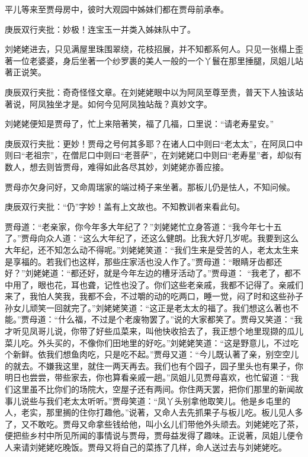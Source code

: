 \begin{parag}


    平儿等来至贾母房中，彼时大观园中姊妹们都在贾母前承奉。\begin{note}庚辰双行夹批：妙极！连宝玉一并类入姊妹队中了。\end{note}刘姥姥进去，只见满屋里珠围翠绕，花枝招展，并不知都系何人。只见一张榻上歪著一位老婆婆，身后坐著一个纱罗裹的美人一般的一个丫鬟在那里捶腿，凤姐儿站著正说笑。\begin{note}庚辰双行夹批：奇奇怪怪文章。在刘姥姥眼中以为阿凤至尊至贵，普天下人独该站著说，阿凤独坐才是。如何今见阿凤独站哉？真妙文字。\end{note}刘姥姥便知是贾母了，忙上来陪著笑，福了几福，口里说：“请老寿星安。”\begin{note}庚辰双行夹批：更妙！贾母之号何其多耶？在诸人口中则曰“老太太”，在阿凤口中则曰“老祖宗”，在僧尼口中则曰“老菩萨”，在刘姥姥口中则曰“老寿星”者，却似有数人，想去则皆贾母，难得如此各尽其妙，刘姥姥亦善应接。\end{note}贾母亦欠身问好，又命周瑞家的端过椅子来坐著。那板儿仍是怯人，不知问候。\begin{note}庚辰双行夹批：“仍”字妙！盖有上文故也。不知教训者来看此句。\end{note}贾母道：“老亲家，你今年多大年纪了？”刘姥姥忙立身答道：“我今年七十五了。”贾母向众人道：“这么大年纪了，还这么健朗。比我大好几岁呢。我要到这么大年纪，还不知怎么动不得呢。”刘姥姥笑道：“我们生来是受苦的人，老太太生来是享福的。若我们也这样，那些庄家活也没人作了。”贾母道：“眼睛牙齿都还好？”刘姥姥道：“都还好，就是今年左边的槽牙活动了。”贾母道： “我老了，都不中用了，眼也花，耳也聋，记性也没了。你们这些老亲戚，我都不记得了。亲戚们来了，我怕人笑我，我都不会，不过嚼的动的吃两口，睡一觉，闷了时和这些孙子孙女儿顽笑一回就完了。”刘姥姥笑道：“这正是老太太的福了。我们想这么著也不能。”贾母道：“什么福，不过是个老废物罢了。”说的大家都笑了。贾母又笑道：“我才听见凤哥儿说，你带了好些瓜菜来，叫他快收拾去了，我正想个地里现撷的瓜儿菜儿吃。外头买的，不像你们田地里的好吃。”刘姥姥笑道：“这是野意儿，不过吃个新鲜。依我们想鱼肉吃，只是吃不起。”贾母又道：“今儿既认著了亲，别空空儿的就去。不嫌我这里，就住一两天再去。我们也有个园子，园子里头也有果子，你明日也尝尝，带些家去，你也算看亲戚一趟。”凤姐儿见贾母喜欢，也忙留道：“我们这里虽不比你们的场院大，空屋子还有两间。你住两天罢，把你们那里的新闻故事儿说些与我们老太太听听。”贾母笑道：“凤丫头别拿他取笑儿。他是乡屯里的人，老实，那里搁的住你打趣他。”说著，又命人去先抓果子与板儿吃。板儿见人多了，又不敢吃。贾母又命拿些钱给他，叫小幺儿们带他外头顽去。刘姥姥吃了茶，便把些乡村中所见所闻的事情说与贾母，贾母益发得了趣味。正说著，凤姐儿便令人来请刘姥姥吃晚饭。贾母又将自己的菜拣了几样，命人送过去与刘姥姥吃。
\end{parag}


